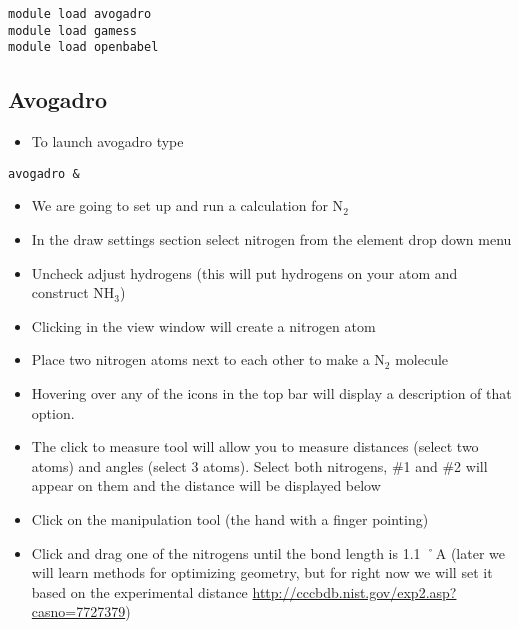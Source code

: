\documentclass[11pt]{article}
\begin{document}
\begin{verbatim}
module load avogadro
module load gamess
module load openbabel
\end{verbatim}

\subsection{Avogadro}
\label{sec:orgb288c4c}

\begin{itemize}
\item To launch avogadro type
\end{itemize}

\begin{verbatim}
avogadro &
\end{verbatim}

\begin{itemize}
\item We are going to set up and run a calculation for N\(_{\text{2}}\)

\item In the draw settings section select nitrogen from the element drop down menu

\item Uncheck adjust hydrogens (this will put hydrogens on your atom and construct NH\(_{\text{3}}\))

\item Clicking in the view window will create a nitrogen atom

\item Place two nitrogen atoms next to each other to make a N\(_{\text{2}}\) molecule

\item Hovering over any of the icons in the top bar will display a description of that option.

\item The click to measure tool will allow you to measure distances (select two atoms) and angles (select 3 atoms). Select both nitrogens, \#1 and \#2 will appear on them and the distance will be displayed below

\item Click on the manipulation tool (the hand with a finger pointing)

\item Click and drag one of the nitrogens until the bond length is 1.1 ˚A (later we will learn methods for optimizing geometry, but for right now we will set it based on the experimental distance \url{http://cccbdb.nist.gov/exp2.asp?casno=7727379})
\end{itemize}
\end{document}
